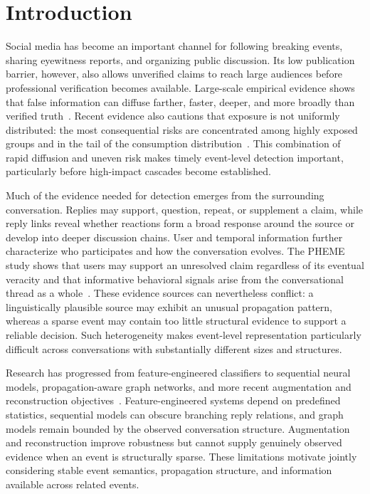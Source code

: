 \documentclass[sigconf,anonymous,review]{../acmart/acmart}
\begin{document}
\maketitle

\section{Introduction}

Social media has become an important channel for following breaking events,
sharing eyewitness reports, and organizing public discussion. Its low
publication barrier, however, also allows unverified claims to reach large
audiences before professional verification becomes available. Large-scale
empirical evidence shows that false information can diffuse farther, faster,
deeper, and more broadly than verified truth~\cite{vosoughi2018spread}.
Recent evidence also cautions that exposure is not uniformly distributed:
the most consequential risks are concentrated among highly exposed groups
and in the tail of the consumption distribution~\cite{budak2024harms}.
This combination of rapid diffusion and uneven risk makes timely event-level
detection important, particularly before high-impact cascades become
established.

Much of the evidence needed for detection emerges from the surrounding
conversation. Replies may support, question, repeat, or supplement a claim,
while reply links reveal whether reactions form a broad response around the
source or develop into deeper discussion chains. User and temporal
information further characterize who participates and how the conversation
evolves. The PHEME study shows that users may support an unresolved claim
regardless of its eventual veracity and that informative behavioral signals
arise from the conversational thread as a whole~\cite{zubiaga2016pheme}.
These evidence sources can nevertheless conflict: a linguistically plausible
source may exhibit an unusual propagation pattern, whereas a sparse event
may contain too little structural evidence to support a reliable decision.
Such heterogeneity makes event-level representation particularly difficult
across conversations with substantially different sizes and structures.

Research has progressed from feature-engineered classifiers to sequential
neural models, propagation-aware graph networks, and more recent augmentation
and reconstruction objectives~\cite{castillo2011credibility,ma2016rnn,
ma2018rvnn,bian2020bigcn,cui2024ragcl,wang2025adaat,
wang2026seegraphmae}. Feature-engineered systems depend on predefined
statistics, sequential models can obscure branching reply relations, and
graph models remain bounded by the observed conversation structure.
Augmentation and reconstruction improve robustness but cannot supply
genuinely observed evidence when an event is structurally sparse. These
limitations motivate jointly considering stable event semantics, propagation
structure, and information available across related events.
\end{document}
